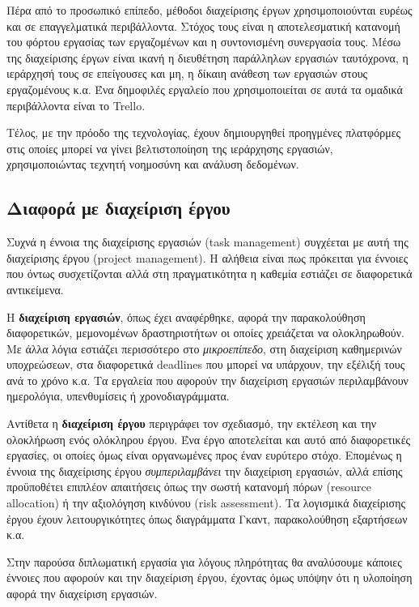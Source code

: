             Πέρα από το προσωπικό επίπεδο, μέθοδοι διαχείρισης έργων χρησιμοποιούνται ευρέως και σε επαγγελματικά περιβάλλοντα. Στόχος τους είναι η αποτελεσματική κατανομή του φόρτου εργασίας των εργαζομένων και η συντονισμένη συνεργασία τους. Μέσω της διαχείρισης έργων είναι ικανή η διευθέτηση παράλληλων εργασιών ταυτόχρονα, η ιεράρχησή τους σε επείγουσες και μη, η δίκαιη ανάθεση των εργασιών στους εργαζομένους κ.α. Ένα δημοφιλές εργαλείο που χρησιμοποιείται σε αυτά τα ομαδικά περιβάλλοντα είναι το Trello. \cite{Trello}

            Τέλος, με την πρόοδο της τεχνολογίας, έχουν δημιουργηθεί προηγμένες πλατφόρμες στις οποίες μπορεί να γίνει βελτιστοποίηση της ιεράρχησης εργασιών, χρησιμοποιώντας τεχνητή νοημοσύνη και ανάλυση δεδομένων. 

        \subsection{Διαφορά με διαχείριση έργου}
            Συχνά η έννοια της διαχείρισης εργασιών (task management) συγχέεται με αυτή της διαχείρισης έργου (project management). Η αλήθεια είναι πως πρόκειται για έννοιες που όντως συσχετίζονται αλλά στη πραγματικότητα η καθεμία εστιάζει σε διαφορετικά αντικείμενα.

            Η \textbf{διαχείριση εργασιών}, όπως έχει αναφέρθηκε, αφορά την παρακολούθηση διαφορετικών, μεμονομένων δραστηριοτήτων οι οποίες χρειάζεται να ολοκληρωθούν. Με άλλα λόγια εστιάζει περισσότερο στο \textit{μικροεπίπεδο}, στη διαχείριση καθημερινών υποχρεώσεων, στα διαφορετικά deadlines που μπορεί να υπάρχουν, την εξέλιξή τους ανά το χρόνο κ.α. Τα εργαλεία που αφορούν την διαχείριση εργασιών περιλαμβάνουν ημερολόγια, υπενθυμίσεις ή χρονοδιαγράμματα.

            Αντίθετα η \textbf{διαχείριση έργου} περιγράφει τον σχεδιασμό, την εκτέλεση και την ολοκλήρωση ενός ολόκληρου έργου. Ένα έργο αποτελείται και αυτό από διαφορετικές εργασίες, οι οποίες όμως είναι οργανωμένες προς έναν ευρύτερο στόχο. Επομένως η έννοια της διαχείρισης έργου \textit{συμπεριλαμβάνει} την διαχείριση εργασιών, αλλά επίσης προϋποθέτει επιπλέον απαιτήσεις όπως την σωστή κατανομή πόρων (resource allocation) ή την αξιολόγηση κινδύνου (risk assessment). Τα λογισμικά διαχείρισης έργου έχουν λειτουργικότητες όπως διαγράμματα Γκαντ, παρακολούθηση εξαρτήσεων κ.α.

            Στην παρούσα διπλωματική εργασία για λόγους πληρότητας θα αναλύσουμε κάποιες έννοιες που αφορούν και την διαχείριση έργου, έχοντας όμως υπόψην ότι η υλοποίηση αφορά την διαχείριση εργασιών.

